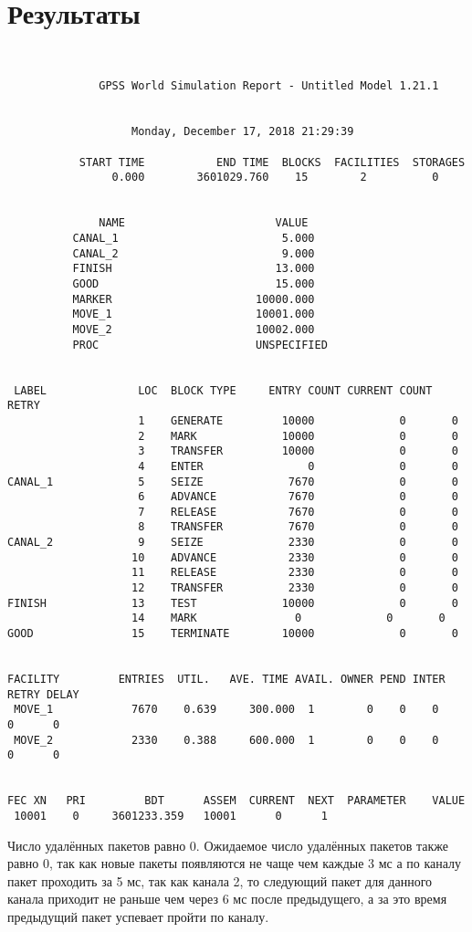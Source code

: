 \documentclass[10pt]{scrartcl}
\makeatletter
\newcommand{\verbatimfont}[1]{\renewcommand{\verbatim@font}{\ttfamily#1}}
\makeatother
\begin{document}
\section*{Результаты}\noindent
\verbatimfont{\small}
\begin{verbatim}
 
 
              GPSS World Simulation Report - Untitled Model 1.21.1
 
 
                   Monday, December 17, 2018 21:29:39  
 
           START TIME           END TIME  BLOCKS  FACILITIES  STORAGES
                0.000        3601029.760    15        2          0
 
 
              NAME                       VALUE  
          CANAL_1                         5.000
          CANAL_2                         9.000
          FINISH                         13.000
          GOOD                           15.000
          MARKER                      10000.000
          MOVE_1                      10001.000
          MOVE_2                      10002.000
          PROC                        UNSPECIFIED
 
 
 LABEL              LOC  BLOCK TYPE     ENTRY COUNT CURRENT COUNT RETRY
                    1    GENERATE         10000             0       0
                    2    MARK             10000             0       0
                    3    TRANSFER         10000             0       0
                    4    ENTER                0             0       0
CANAL_1             5    SEIZE             7670             0       0
                    6    ADVANCE           7670             0       0
                    7    RELEASE           7670             0       0
                    8    TRANSFER          7670             0       0
CANAL_2             9    SEIZE             2330             0       0
                   10    ADVANCE           2330             0       0
                   11    RELEASE           2330             0       0
                   12    TRANSFER          2330             0       0
FINISH             13    TEST             10000             0       0
                   14    MARK               0             0       0
GOOD               15    TERMINATE        10000             0       0
 
 
FACILITY         ENTRIES  UTIL.   AVE. TIME AVAIL. OWNER PEND INTER RETRY DELAY
 MOVE_1            7670    0.639     300.000  1        0    0    0     0      0
 MOVE_2            2330    0.388     600.000  1        0    0    0     0      0
 
 
FEC XN   PRI         BDT      ASSEM  CURRENT  NEXT  PARAMETER    VALUE
 10001    0     3601233.359   10001      0      1
\end{verbatim}
Число удалённых пакетов равно 0.
Ожидаемое число удалённых пакетов также равно 0, так как новые пакеты появляются не чаще чем каждые 3 мс а по каналу пакет проходить за 5 мс, так как канала 2, то следующий пакет для данного канала приходит не раньше чем через 6 мс после предыдущего, а за это время предыдущий пакет успевает пройти по каналу.
\end{document}
